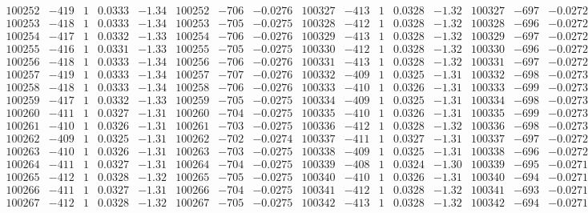 \documentclass[11pt,reqno,a4letter]{article}
\numberwithin{figure}{section}
\numberwithin{table}{section}
\theoremstyle{plain}
\numberwithin{theorem}{section}
\theoremstyle{definition}
\begin{document}
\begin{table}[ht!]
\begin{equation*}
{\begin{array}{ccccc|ccc||ccccc|ccc}
100252 & -419 & 1 & 0.0333 & -1.34 & 100252 & -706 & -0.0276 & 100327 & -413 & 1 & 0.0328 & -1.32 & 100327 & -697 & -0.0272  \\
100253 & -418 & 1 & 0.0333 & -1.34 & 100253 & -705 & -0.0275 & 100328 & -412 & 1 & 0.0328 & -1.32 & 100328 & -696 & -0.0272  \\
100254 & -417 & 1 & 0.0332 & -1.33 & 100254 & -706 & -0.0276 & 100329 & -413 & 1 & 0.0328 & -1.32 & 100329 & -697 & -0.0272  \\
100255 & -416 & 1 & 0.0331 & -1.33 & 100255 & -705 & -0.0275 & 100330 & -412 & 1 & 0.0328 & -1.32 & 100330 & -696 & -0.0272  \\
100256 & -418 & 1 & 0.0333 & -1.34 & 100256 & -706 & -0.0276 & 100331 & -413 & 1 & 0.0328 & -1.32 & 100331 & -697 & -0.0272  \\
100257 & -419 & 1 & 0.0333 & -1.34 & 100257 & -707 & -0.0276 & 100332 & -409 & 1 & 0.0325 & -1.31 & 100332 & -698 & -0.0273  \\
100258 & -418 & 1 & 0.0333 & -1.34 & 100258 & -706 & -0.0276 & 100333 & -410 & 1 & 0.0326 & -1.31 & 100333 & -699 & -0.0273  \\
100259 & -417 & 1 & 0.0332 & -1.33 & 100259 & -705 & -0.0275 & 100334 & -409 & 1 & 0.0325 & -1.31 & 100334 & -698 & -0.0273  \\
100260 & -411 & 1 & 0.0327 & -1.31 & 100260 & -704 & -0.0275 & 100335 & -410 & 1 & 0.0326 & -1.31 & 100335 & -699 & -0.0273  \\
100261 & -410 & 1 & 0.0326 & -1.31 & 100261 & -703 & -0.0275 & 100336 & -412 & 1 & 0.0328 & -1.32 & 100336 & -698 & -0.0273  \\
100262 & -409 & 1 & 0.0325 & -1.31 & 100262 & -702 & -0.0274 & 100337 & -411 & 1 & 0.0327 & -1.31 & 100337 & -697 & -0.0272  \\
100263 & -410 & 1 & 0.0326 & -1.31 & 100263 & -703 & -0.0275 & 100338 & -409 & 1 & 0.0325 & -1.31 & 100338 & -696 & -0.0272  \\
100264 & -411 & 1 & 0.0327 & -1.31 & 100264 & -704 & -0.0275 & 100339 & -408 & 1 & 0.0324 & -1.30 & 100339 & -695 & -0.0271  \\
100265 & -412 & 1 & 0.0328 & -1.32 & 100265 & -705 & -0.0275 & 100340 & -410 & 1 & 0.0326 & -1.31 & 100340 & -694 & -0.0271  \\
100266 & -411 & 1 & 0.0327 & -1.31 & 100266 & -704 & -0.0275 & 100341 & -412 & 1 & 0.0328 & -1.32 & 100341 & -693 & -0.0271  \\
100267 & -412 & 1 & 0.0328 & -1.32 & 100267 & -705 & -0.0275 & 100342 & -413 & 1 & 0.0328 & -1.32 & 100342 & -694 & -0.0271  \\

\end{array}}
\end{equation*}
\end{table}
\end{document}
